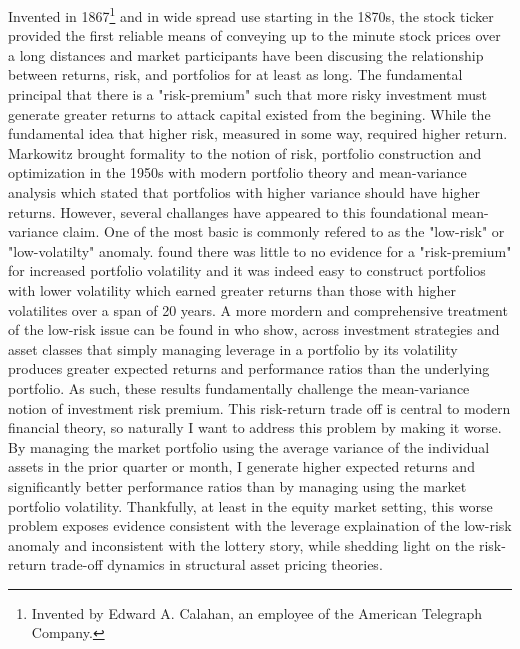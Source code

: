 \noindent Invented in 1867\footnote{Invented by Edward A. Calahan, an employee of the American Telegraph Company.} and in wide spread use starting in the 1870s, the stock ticker provided the first reliable means of conveying up to the minute stock prices over a long distances and market participants have been discusing the relationship between returns, risk, and portfolios for at least as long.\cite{rutterford_financial_2016} The fundamental principal that there is a "risk-premium" such that more risky investment must generate greater returns to attack capital existed from the begining. While the fundamental idea that higher risk, measured in some way, required higher return. Markowitz brought formality to the notion of risk, portfolio construction and optimization in the 1950s with modern portfolio theory and mean-variance analysis which stated that portfolios with higher variance should have higher returns.\cite{markowitz_portfolio_1952} However, several challanges have appeared to this foundational mean-variance claim. One of the most basic is commonly refered to as the "low-risk" or "low-volatilty" anomaly. \cite{haugen_1972} found there was little to no evidence for a "risk-premium" for increased portfolio volatility and it was indeed easy to construct portfolios with lower volatility which earned greater returns than those with higher volatilites over a span of 20 years. A more mordern and comprehensive treatment of the low-risk issue can be found in \cite{moreira_volatility-managed_2017} who show, across investment strategies and asset classes that simply managing leverage in a portfolio by its volatility produces greater expected returns and performance ratios than the underlying portfolio. As such, these results fundamentally challenge the mean-variance notion of investment risk premium. This risk-return trade off is central to modern financial theory, so naturally I want to address this problem by making it worse. By managing the market portfolio using the average variance of the individual assets in the prior quarter or month, I generate higher expected returns and significantly better performance ratios than by managing using the market portfolio volatility. Thankfully, at least in the equity market setting, this worse problem exposes evidence consistent with the leverage explaination of the low-risk anomaly and inconsistent with the lottery story, while shedding light on the risk-return trade-off dynamics in structural asset pricing theories.


